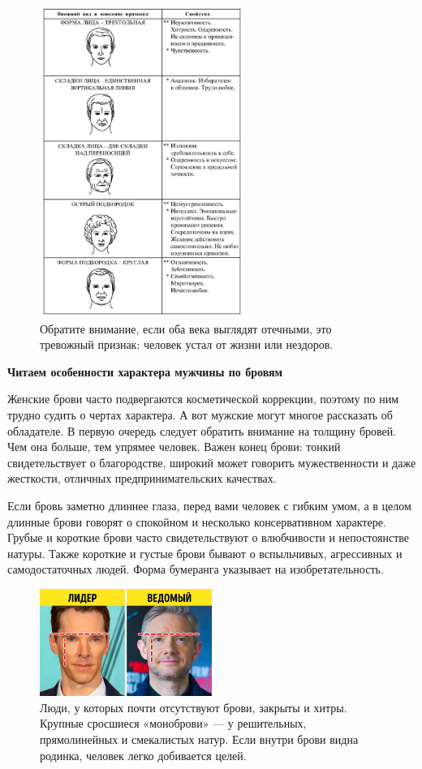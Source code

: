 \begin{figure}
    \centering
    \includegraphics[width=0.6\textwidth]{img/faces.png}
    \caption{Обратите внимание, если оба века выглядят отечными, это тревожный признак: человек устал от жизни или нездоров.}
\end{figure}

\textbf{Читаем особенности характера мужчины по бровям}

Женские брови часто подвергаются косметической коррекции, поэтому по ним трудно судить о чертах характера. А вот мужские могут многое рассказать об обладателе. В первую очередь следует обратить внимание на толщину бровей. Чем она больше, тем упрямее человек. Важен конец брови: тонкий свидетельствует о благородстве, широкий может говорить мужественности и даже жесткости, отличных предпринимательских качествах.

Если бровь заметно длиннее глаза, перед вами человек с гибким умом, а в целом длинные брови говорят о спокойном и несколько консервативном характере. Грубые и короткие брови часто свидетельствуют о влюбчивости и непостоянстве натуры. Также короткие и густые брови бывают о вспыльчивых, агрессивных и самодостаточных людей. Форма бумеранга указывает на изобретательность.

\begin{figure}[h]
    \centering
    \includegraphics[width=0.5\textwidth]{img/brows.png}
    \caption{Люди, у которых почти отсутствуют брови, закрыты и хитры. Крупные сросшиеся «моноброви» — у решительных, прямолинейных и смекалистых натур. Если внутри брови видна родинка, человек легко добивается целей.}
\end{figure}

